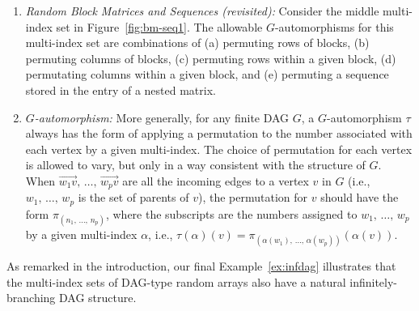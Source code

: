 \documentclass[AHL,Unicode,longabstracts,published]{cedram}
\begin{document}
\begin{exam}
\begin{enumerate}
\item \label{list2.3.3}\emph{Random Block Matrices and Sequences (revisited):} Consider the middle multi-index set in Figure~\ref{fig:bm-seq1}. The allowable $G$-automorphisms for this multi-index set are combinations of (a) permuting rows of blocks, (b) permuting columns of blocks, (c) permuting rows within a given block, (d) permutating columns within a given block, and (e) permuting a sequence stored in the entry of a nested matrix.


\item \label{list2.3.4}\emph{$G$-automorphism:} More generally, for any finite DAG $G$, a $G$-automorphism $\tau$ always has the form of applying a permutation to the number associated with each vertex by a given multi-index. The choice of permutation for each vertex is allowed to vary, but only in a way consistent with the structure of $G$. When $\overrightarrow{w_1v},\,\ldots,\,\overrightarrow{w_pv}$ are all the incoming edges to a vertex $v$ in $G$ (i.e., $w_1,\,\ldots,\,w_p$ is the set of parents of $v$), the permutation for $v$ should have the form $\pi_{(n_1,\,\ldots,\,n_p)}$, where the subscripts are the numbers assigned to $w_1,\,\ldots,\,w_p$ by a given multi-index $\alpha$, i.e., $\tau(\alpha)(v) = \pi_{(\alpha(w_1),\,\ldots,\,\alpha(w_p))}(\alpha(v))$.
\end{enumerate}
\end{exam}

As remarked in the introduction, our final Example~\ref{ex:infdag} illustrates that the multi-index sets of DAG-type random arrays also have a natural infinitely-branching DAG structure.
\end{document}
